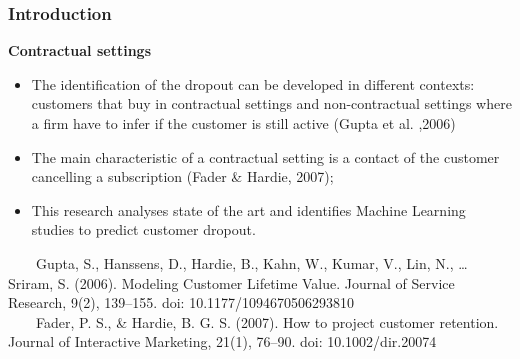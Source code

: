 \documentclass[10pt]{beamer}
\begin{document}
\begin{frame}
	\frametitle{Introduction}
	\Large
	\textbf{Contractual settings}\\
		\begin{itemize} \normalsize
			\item The identification of the dropout can be developed in different contexts: customers that buy in contractual settings and non-contractual settings where a firm have to infer if the customer is still active \footnotesize(Gupta et al. ,2006) \normalsize
			\item The main characteristic of a contractual setting is a contact of the customer cancelling a subscription \footnotesize(Fader \& Hardie, 2007)\normalsize;
			\item This research analyses state of the art and identifies Machine Learning studies to predict customer dropout.
		\end{itemize}	
	\tiny
	~~~~Gupta, S., Hanssens, D., Hardie, B., Kahn, W., Kumar, V., Lin, N., … Sriram, S. (2006). Modeling Customer Lifetime Value. Journal of Service Research, 9(2), 139–155. doi: 10.1177/1094670506293810 \\
	~~~~Fader, P. S., \& Hardie, B. G. S. (2007). How to project customer retention. Journal of Interactive Marketing, 21(1), 76–90. doi: 10.1002/dir.20074\\
\end{frame}

\end{document}
